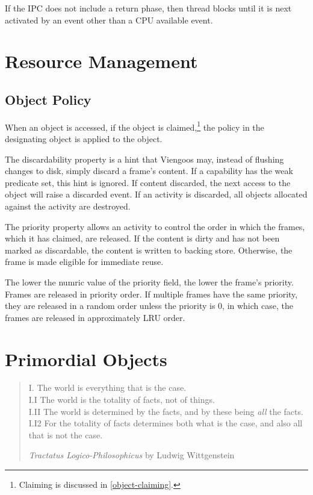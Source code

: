 If the IPC does not include a return phase, then thread blocks until
it is next activated by an event other than a CPU available event.


\chapter{Resource Management}
\label{chapter:resource-management}

\section{Object Policy}

When an object is accessed, if the object is
claimed,\footnote{Claiming is discussed in \ref{object-claiming}.} the
policy in the designating object is applied to the object.

The discardability property is a hint that Viengoos may, instead of
flushing changes to disk, simply discard a frame's content.  If a
capability has the weak predicate set, this hint is ignored.  If
content discarded, the next access to the object will raise a
discarded event.  If an activity is discarded, all objects allocated
against the activity are destroyed.

The priority property allows an activity to control the order in which
the frames, which it has claimed, are released.  If the content is
dirty and has not been marked as discardable, the content is written
to backing store.  Otherwise, the frame is made eligible for immediate
reuse.

The lower the numric value of the priority field, the lower the
frame's priority.  Frames are released in priority order.  If multiple
frames have the same priority, they are released in a random order
unless the priority is 0, in which case, the frames are released in
approximately LRU order.



\chapter{Primordial Objects}

\begin{quotation}
\noindent
I. The world is everything that is the case.\\
I.I The world is the totality of facts, not of things.\\
I.II The world is determined by the facts, and by these being
\emph{all} the facts.\\
I.I2 For the totality of facts determines both what is the case, and
also all that is not the case.

\begin{flushright}
\emph{Tractatus Logico-Philosophicus} by Ludwig Wittgenstein
\end{flushright}
\end{quotation}

